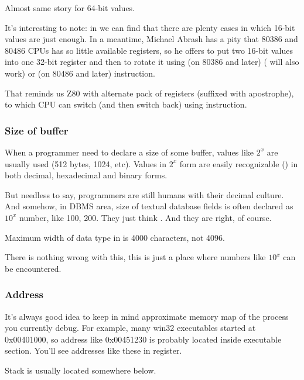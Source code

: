 Almost same story for 64-bit values.


It's interesting to note: in 
we can find that there are plenty cases in which 16-bit values are just enough.
In a meantime, Michael Abrash has a pity that 80386 and 80486 CPUs has so little available registers, so he offers to put
two 16-bit values into one 32-bit register and then to rotate it using
 (on 80386 and later) ( will also work) or 
 (on 80486 and later) instruction.

That reminds us Z80 with alternate pack of registers (suffixed with apostrophe), to which CPU can switch
(and then switch back) using  instruction.

\subsubsection{Size of buffer}

When a programmer need to declare a size of some buffer, values like $2^x$ are usually used (512 bytes, 1024, etc).
Values in $2^x$ form are easily recognizable () in both decimal, hexadecimal and binary forms.

But needless to say, programmers are still humans with their decimal culture.
And somehow, in \ac{DBMS} area, size of textual database fields is often declared as $10^x$ number, like 100, 200.
They just think .
And they are right, of course.

Maximum width of  data type in \oracle is 4000 characters, not 4096.

There is nothing wrong with this, this is just a place where numbers like $10^x$ can be encountered.

\subsubsection{Address}

It's always good idea to keep in mind approximate memory map of the process you currently debug.
For example, many win32 executables started at 0x00401000, so address like 0x00451230 is probably located inside
executable section. You'll see addresses like these in  register.

Stack is usually located somewhere below. %

